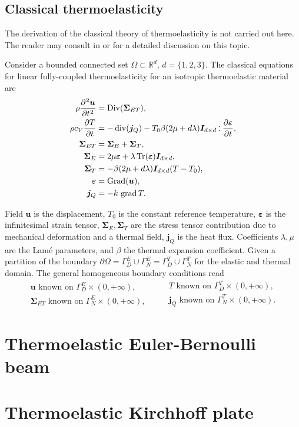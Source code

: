 \subsection{Classical thermoelasticity}
The derivation of the classical theory of thermoelasticity is not carried out here. The reader may consult in \cite[Chapter 1]{hetnarski2009thermal} or \cite[Chapter 8]{abeyaratne2012notes} for a detailed discussion on this topic. 

Consider a bounded connected set $\Omega \subset \mathbb{R}^d, \, d=\{1,2,3\}$. The classical equations for linear fully-coupled thermoelasticity for an isotropic thermoelastic material are \cite{carlson1973}
\begin{equation}\label{eq:sysThElas}
\begin{aligned}
\displaystyle \rho \diffp[2]{\bm{u}}{t} &= \Div(\bm{\Sigma}_{ET}) , \\
\displaystyle \rho c_V \diffp{T}{t} &= -\div(\bm{j}_Q) - T_0 \beta (2 \mu + d \lambda) \bm{I}_{d\times d} \cddot \displaystyle\diffp{\bm{\varepsilon}}{t}, \\
\bm{\Sigma}_{ET} &= \bm{\Sigma}_E + \bm{\Sigma}_{T}, \\
\bm{\Sigma}_E &= 2\mu \bm{\varepsilon} + \lambda \Tr(\bm{\varepsilon}) \bm{I}_{d\times d}, \\
\bm{\Sigma}_T &= - \beta (2 \mu + d \lambda) \bm{I}_{d\times d} (T - T_0),  \\
\bm{\varepsilon} &= \Grad(\bm{u}), \\
\bm{j}_Q &= -k \, \grad T.
\end{aligned}
\end{equation}

Field $\bm{u}$ is the displacement, $T_0$ is the constant reference temperature, $\bm{\varepsilon}$ is the infinitesimal strain tensor, $\bm{\Sigma}_E, \bm{\Sigma}_T$ are the stress tensor contribution due to mechanical deformation and a thermal field, $\bm{j}_Q$ is the heat flux. Coefficients $\lambda, \mu$ are the Lam\'e parameters,  and $\beta$ the thermal expansion coefficient. Given a partition of the boundary $\partial \Omega = \Gamma_D^E \cup \Gamma_N^E = \Gamma_D^T \cup \Gamma_N^T$ for the elastic and thermal domain. The general homogeneous boundary conditions read 
\begin{equation}
\begin{aligned}
\bm{u} \text{ known on } \Gamma_D^E \times (0, +\infty), \\
\bm{\Sigma}_{ET} \text{ known on } \Gamma_N^E \times (0, +\infty), 
\end{aligned} \qquad
\begin{aligned}
T \text{ known on } \Gamma_D^T \times (0, +\infty), \\
\bm{j}_Q \text{ known on } \Gamma_N^T \times (0, +\infty).
\end{aligned}
\end{equation}


\section{Thermoelastic Euler-Bernoulli beam}

\section{Thermoelastic Kirchhoff plate}
